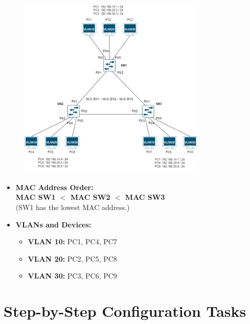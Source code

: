 \documentclass[a4paper]{book}
\begin{document}
\begin{figure}[h]
    \centering
    \includegraphics[width=0.8\textwidth]{img/pvst01.png}
    \caption{\textit{}}
\end{figure}


\begin{itemize}
    \item \textbf{MAC Address Order:} \\
    \textbf{MAC SW1 $<$ MAC SW2 $<$ MAC SW3} \\
    (SW1 has the lowest MAC address.)
    
    \item \textbf{VLANs and Devices:}
    \begin{itemize}
        \item \textbf{VLAN 10:} PC1, PC4, PC7
        \item \textbf{VLAN 20:} PC2, PC5, PC8
        \item \textbf{VLAN 30:} PC3, PC6, PC9
    \end{itemize}
\end{itemize}

\section*{Step-by-Step Configuration Tasks}
\end{document}
